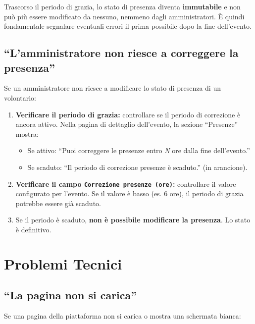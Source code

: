 \documentclass[a4paper,11pt,oneside]{book}
\newcommand{\campo}[1]{\texttt{#1}}
\begin{document}
\begin{warningbox}
Trascorso il periodo di grazia, lo stato di presenza diventa \textbf{immutabile} e non pu\`o pi\`u essere modificato da nessuno, nemmeno dagli amministratori. \`E quindi fondamentale segnalare eventuali errori il prima possibile dopo la fine dell'evento.
\end{warningbox}

\subsection{``L'amministratore non riesce a correggere la presenza''}

Se un amministratore non riesce a modificare lo stato di presenza di un volontario:

\begin{enumerate}[leftmargin=1.5em]
  \item \textbf{Verificare il periodo di grazia:} controllare se il periodo di correzione \`e ancora attivo. Nella pagina di dettaglio dell'evento, la sezione ``Presenze'' mostra:
    \begin{itemize}
      \item Se attivo: ``Puoi correggere le presenze entro \textit{N} ore dalla fine dell'evento.''
      \item Se scaduto: ``Il periodo di correzione presenze \`e scaduto.'' (in arancione).
    \end{itemize}
  \item \textbf{Verificare il campo \campo{Correzione presenze (ore)}:} controllare il valore configurato per l'evento. Se il valore \`e basso (es. 6 ore), il periodo di grazia potrebbe essere gi\`a scaduto.
  \item Se il periodo \`e scaduto, \textbf{non \`e possibile modificare la presenza}. Lo stato \`e definitivo.
\end{enumerate}

\section{Problemi Tecnici}
\label{sec:problemi-tecnici}

\subsection{``La pagina non si carica''}

Se una pagina della piattaforma non si carica o mostra una schermata bianca:
\end{document}
